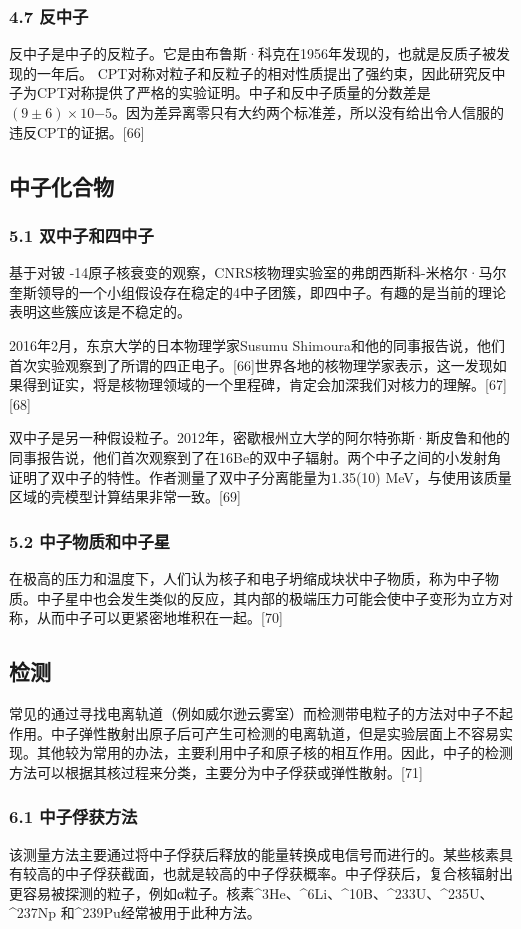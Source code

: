 \subsubsection{4.7 反中子}
反中子是中子的反粒子。它是由布鲁斯·科克在1956年发现的，也就是反质子被发现的一年后。 CPT对称对粒子和反粒子的相对性质提出了强约束，因此研究反中子为CPT对称提供了严格的实验证明。中子和反中子质量的分数差是$(9\pm6)\times10{-5}$。因为差异离零只有大约两个标准差，所以没有给出令人信服的违反CPT的证据。[66]

\subsection{中子化合物}
\subsubsection{5.1 双中子和四中子}
基于对铍 -14原子核衰变的观察，CNRS核物理实验室的弗朗西斯科-米格尔·马尔奎斯领导的一个小组假设存在稳定的4中子团簇，即四中子。有趣的是当前的理论表明这些簇应该是不稳定的。

2016年2月，东京大学的日本物理学家Susumu Shimoura和他的同事报告说，他们首次实验观察到了所谓的四正电子。[66]世界各地的核物理学家表示，这一发现如果得到证实，将是核物理领域的一个里程碑，肯定会加深我们对核力的理解。[67][68]

双中子是另一种假设粒子。2012年，密歇根州立大学的阿尔特弥斯·斯皮鲁和他的同事报告说，他们首次观察到了在16Be的双中子辐射。两个中子之间的小发射角证明了双中子的特性。作者测量了双中子分离能量为1.35(10) MeV，与使用该质量区域的壳模型计算结果非常一致。[69]

\subsubsection{5.2 中子物质和中子星}
在极高的压力和温度下，人们认为核子和电子坍缩成块状中子物质，称为中子物质。中子星中也会发生类似的反应，其内部的极端压力可能会使中子变形为立方对称，从而中子可以更紧密地堆积在一起。[70]

\subsection{检测}
常见的通过寻找电离轨道（例如威尔逊云雾室）而检测带电粒子的方法对中子不起作用。中子弹性散射出原子后可产生可检测的电离轨道，但是实验层面上不容易实现。其他较为常用的办法，主要利用中子和原子核的相互作用。因此，中子的检测方法可以根据其核过程来分类，主要分为中子俘获或弹性散射。[71]

\subsubsection{6.1 中子俘获方法}
该测量方法主要通过将中子俘获后释放的能量转换成电信号而进行的。某些核素具有较高的中子俘获截面，也就是较高的中子俘获概率。中子俘获后，复合核辐射出更容易被探测的粒子，例如α粒子。核素^3He、^6Li、^10B、^233U、^235U、^237Np 和^239Pu经常被用于此种方法。















